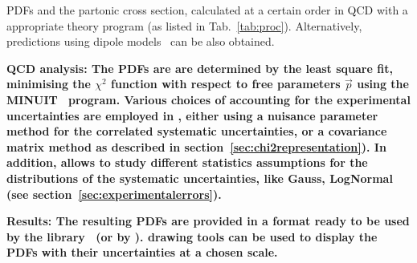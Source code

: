\begin{description}
PDFs and the partonic cross section, calculated at a certain order in QCD 
with a appropriate theory program (as listed in Tab.~\ref{tab:proc}).
Alternatively, predictions using dipole models~\cite{Golec-Biernat:1998js,Iancu:2003ge,Bartels:2002cj} can be also obtained.
\item
\bf{QCD analysis:} \rm  
The PDFs are 
are determined by the least square fit, minimising the $\chi^2$ function with respect to free parameters $\vec{p}$
using the MINUIT~\cite{minuit} program.
Various choices of accounting for the experimental uncertainties are employed in \fitter, either using 
a nuisance parameter method for the correlated systematic uncertainties, 
or a covariance matrix method as described in section~\ref{sec:chi2representation}). In addition, \fitter allows to study different statistics 
assumptions for the distributions of the systematic uncertainties, like Gauss, LogNormal~\cite{hera-lhc:report2009} (see section~\ref{sec:experimentalerrors}).
%
%
\item
\bf{Results:} \rm 
The resulting PDFs are provided in a format ready to be used by the \lhapdf 
library~\cite{lhapdf,lhapdfweb} (or by \tmdlib \cite{tmdlref}).
\fitter drawing tools can be used to display the PDFs with their uncertainties at a chosen scale.  

\end{description}
